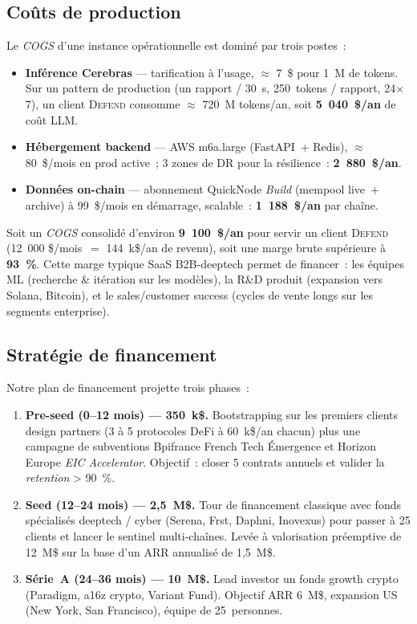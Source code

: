 \documentclass[11pt,a4paper]{article}
\begin{document}
\subsection{Coûts de production}

Le \emph{COGS} d'une instance opérationnelle est dominé par trois postes~:

\begin{itemize}
  \item \textbf{Inférence Cerebras} --- tarification à l'usage, $\approx$
        7~\$ pour 1~M de tokens. Sur un pattern de production
        (un rapport / 30~s, 250~tokens / rapport, 24$\times$7), un client
        \textsc{Defend} consomme $\approx$ 720~M tokens/an, soit
        \textbf{5~040~\$/an} de coût LLM.
  \item \textbf{Hébergement backend} --- AWS m6a.large (FastAPI~+ Redis),
        $\approx$ 80~\$/mois en prod active~; 3 zones de DR pour la
        résilience~: \textbf{2~880~\$/an}.
  \item \textbf{Données on-chain} --- abonnement QuickNode \emph{Build}
        (mempool live~+ archive) à 99~\$/mois en démarrage, scalable~:
        \textbf{1~188~\$/an} par chaîne.
\end{itemize}

\medskip

Soit un \emph{COGS} consolidé d'environ \textbf{9~100~\$/an} pour servir
un client \textsc{Defend} (12~000 \$/mois~$=$ 144~k\$/an de revenu),
soit une marge brute supérieure à \textbf{93~\%}. Cette marge typique
SaaS B2B-deeptech permet de financer~: les équipes ML (recherche \&
itération sur les modèles), la R\&D produit (expansion vers Solana,
Bitcoin), et le sales/customer success (cycles de vente longs sur les
segments enterprise).

\subsection{Stratégie de financement}

Notre plan de financement projette trois phases~:

\begin{enumerate}
  \item \textbf{Pre-seed (0--12 mois) --- 350~k\$.}
        Bootstrapping sur les premiers clients design partners (3 à 5
        protocoles DeFi à 60~k\$/an chacun) plus une campagne de
        subventions Bpifrance French Tech Émergence et Horizon Europe
        \emph{EIC Accelerator}. Objectif~: closer 5 contrats annuels et
        valider la \emph{retention} > 90~\%.
  \item \textbf{Seed (12--24 mois) --- 2,5~M\$.}
        Tour de financement classique avec fonds spécialisés deeptech /
        cyber (Serena, Frst, Daphni, Inovexus) pour passer à 25 clients
        et lancer le sentinel multi-chaînes. Levée à valorisation
        préemptive de 12~M\$ sur la base d'un ARR annualisé de 1,5~M\$.
  \item \textbf{Série~A (24--36 mois) --- 10~M\$.}
        Lead investor un fonds growth crypto (Paradigm, a16z crypto,
        Variant Fund). Objectif ARR 6~M\$, expansion US (New York,
        San Francisco), équipe de 25~personnes.
\end{enumerate}
\end{document}
